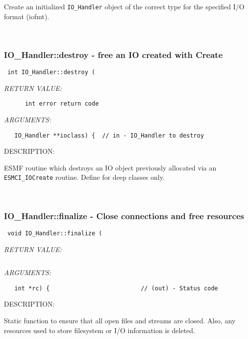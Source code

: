       Create an initialized {\tt IO_Handler} object of the correct type for
      the specified I/O format (iofmt). 
 
\mbox{}\hrulefill\
 
\subsubsection [IO\_Handler::destroy] {IO\_Handler::destroy - free an IO created with Create}


  
\begin{verbatim} int IO_Handler::destroy (\end{verbatim}{\em RETURN VALUE:}
\begin{verbatim}      int error return code\end{verbatim}{\em ARGUMENTS:}
\begin{verbatim}   IO_Handler **ioclass) {  // in - IO_Handler to destroy\end{verbatim}
{\sf DESCRIPTION:\\ }


        ESMF routine which destroys an IO object previously allocated
        via an {\tt ESMCI\_IOCreate} routine.  Define for deep classes only.
   
 
\mbox{}\hrulefill\
 
\subsubsection [IO\_Handler::finalize] {IO\_Handler::finalize - Close connections and free resources}


  
\begin{verbatim} void IO_Handler::finalize (\end{verbatim}{\em RETURN VALUE:}
\begin{verbatim} \end{verbatim}{\em ARGUMENTS:}
\begin{verbatim}   int *rc) {                          // (out) - Status code\end{verbatim}
{\sf DESCRIPTION:\\ }


        Static function to ensure that all open files and streams are closed.
        Also, any resources used to store filesystem or I/O information is
        deleted.
   
